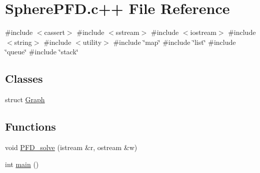 \hypertarget{SpherePFD_8c_09_09}{\section{\-Sphere\-P\-F\-D.\-c++ \-File \-Reference}
\label{SpherePFD_8c_09_09}
}
{\ttfamily \#include $<$cassert$>$}\*
{\ttfamily \#include $<$sstream$>$}\*
{\ttfamily \#include $<$iostream$>$}\*
{\ttfamily \#include $<$string$>$}\*
{\ttfamily \#include $<$utility$>$}\*
{\ttfamily \#include \char`\"{}map\char`\"{}}\*
{\ttfamily \#include \char`\"{}list\char`\"{}}\*
{\ttfamily \#include \char`\"{}queue\char`\"{}}\*
{\ttfamily \#include \char`\"{}stack\char`\"{}}\*
\subsection*{\-Classes}
\begin{DoxyCompactItemize}
\item 
struct \hyperlink{structGraph}{\-Graph}
\end{DoxyCompactItemize}
\subsection*{\-Functions}
\begin{DoxyCompactItemize}
\item 
void \hyperlink{SpherePFD_8c_09_09_ad1fb4f8285d98373eb99cc90453aa1df}{\-P\-F\-D\-\_\-solve} (istream \&r, ostream \&w)
\item 
int \hyperlink{SpherePFD_8c_09_09_ae66f6b31b5ad750f1fe042a706a4e3d4}{main} ()
\end{DoxyCompactItemize}


